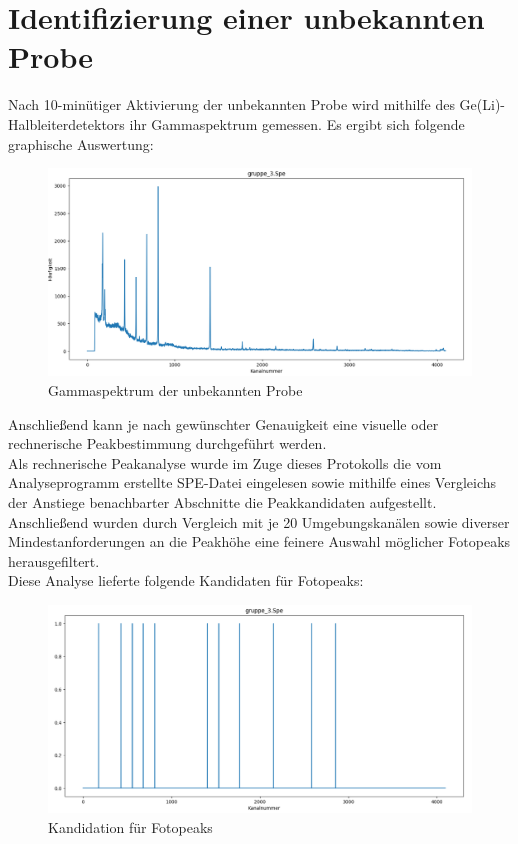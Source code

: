 \documentclass[12pt,german]{article}
\begin{document}
    \section{Identifizierung einer unbekannten Probe}
    Nach 10-minütiger Aktivierung der unbekannten Probe wird mithilfe des Ge(Li)-Halbleiterdetektors ihr Gammaspektrum gemessen. Es ergibt sich folgende graphische Auswertung: \\
    \begin{figure}[H]
        \centering
        \includegraphics[width=1.0\textwidth]{pics/gruppe_3.png}
        \caption{Gammaspektrum der unbekannten Probe}
    \end{figure}

    Anschließend kann je nach gewünschter Genauigkeit eine visuelle oder rechnerische Peakbestimmung durchgeführt werden. \\
    Als rechnerische Peakanalyse wurde im Zuge dieses Protokolls die vom Analyseprogramm erstellte SPE-Datei eingelesen sowie mithilfe eines Vergleichs der Anstiege benachbarter Abschnitte die Peakkandidaten aufgestellt. \\
    Anschließend wurden durch Vergleich mit je 20 Umgebungskanälen sowie diverser Mindestanforderungen an die Peakhöhe eine feinere Auswahl möglicher Fotopeaks herausgefiltert. \\
    Diese Analyse lieferte folgende Kandidaten für Fotopeaks: \\
    \begin{figure}[H]
        \centering
        \includegraphics[width=1.0\textwidth]{pics/gruppe_3_peaks.png}
        \caption{Kandidation für Fotopeaks}
    \end{figure}
    
\end{document}
